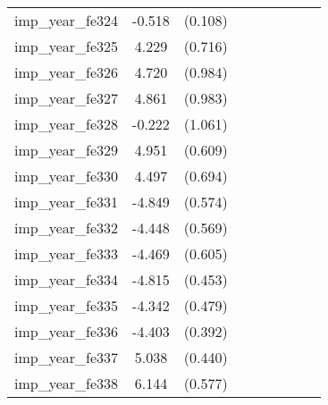 {\begin{tabular}{l*{4}{cc}}
imp\_year\_fe324&   -0.518\sym{***}&  (0.108)&                  &         &                  &         &                  &         \\
imp\_year\_fe325&    4.229\sym{***}&  (0.716)&                  &         &                  &         &                  &         \\
imp\_year\_fe326&    4.720\sym{***}&  (0.984)&                  &         &                  &         &                  &         \\
imp\_year\_fe327&    4.861\sym{***}&  (0.983)&                  &         &                  &         &                  &         \\
imp\_year\_fe328&   -0.222         &  (1.061)&                  &         &                  &         &                  &         \\
imp\_year\_fe329&    4.951\sym{***}&  (0.609)&                  &         &                  &         &                  &         \\
imp\_year\_fe330&    4.497\sym{***}&  (0.694)&                  &         &                  &         &                  &         \\
imp\_year\_fe331&   -4.849\sym{***}&  (0.574)&                  &         &                  &         &                  &         \\
imp\_year\_fe332&   -4.448\sym{***}&  (0.569)&                  &         &                  &         &                  &         \\
imp\_year\_fe333&   -4.469\sym{***}&  (0.605)&                  &         &                  &         &                  &         \\
imp\_year\_fe334&   -4.815\sym{***}&  (0.453)&                  &         &                  &         &                  &         \\
imp\_year\_fe335&   -4.342\sym{***}&  (0.479)&                  &         &                  &         &                  &         \\
imp\_year\_fe336&   -4.403\sym{***}&  (0.392)&                  &         &                  &         &                  &         \\
imp\_year\_fe337&    5.038\sym{***}&  (0.440)&                  &         &                  &         &                  &         \\
imp\_year\_fe338&    6.144\sym{***}&  (0.577)&                  &         &                  &         &                  &         \\

\end{tabular}}
